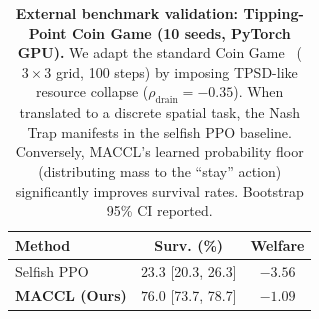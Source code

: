 \begin{table}[h]
\centering
\caption{%
  \textbf{External benchmark validation: Tipping-Point Coin Game (10 seeds, PyTorch GPU).}
  We adapt the standard Coin Game~\citep{lerer2017maintaining} ($3{\times}3$ grid, 100 steps)
  by imposing TPSD-like resource collapse ($\rho_{\text{drain}}{=}-0.35$).
  When translated to a discrete spatial task, the Nash Trap manifests in the selfish PPO baseline. 
  Conversely, MACCL's learned probability floor (distributing mass to the ``stay'' action) 
  significantly improves survival rates. Bootstrap 95\% CI reported.
}
\label{tab:coin_game_deep}
\small
\begin{tabular}{@{}lcc@{}}
\toprule
\textbf{Method} & \textbf{Surv. (\%)} & \textbf{Welfare} \\
\midrule
Selfish PPO & $23.3$ \tiny{[20.3, 26.3]} & $-3.56$ \\
\midrule
\textbf{MACCL (Ours)} & $\mathbf{76.0}$ \tiny{[73.7, 78.7]} & $\mathbf{-1.09}$ \\
\bottomrule
\end{tabular}
\end{table}
